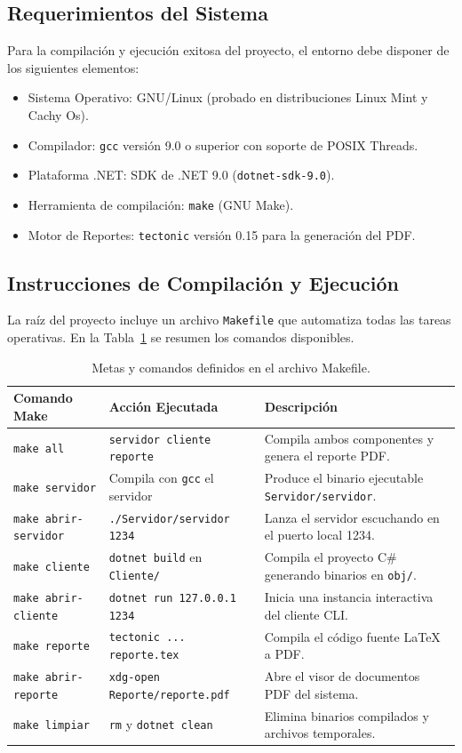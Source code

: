 \documentclass[12pt,a4paper]{article}
\begin{document}
\subsection{Requerimientos del Sistema}
Para la compilación y ejecución exitosa del proyecto, el entorno debe disponer de los siguientes elementos:
\begin{itemize}
    \item Sistema Operativo: GNU/Linux (probado en distribuciones Linux Mint y Cachy Os).
    \item Compilador: \texttt{gcc} versión 9.0 o superior con soporte de POSIX Threads.
    \item Plataforma .NET: SDK de .NET 9.0 (\texttt{dotnet-sdk-9.0}).
    \item Herramienta de compilación: \texttt{make} (GNU Make).
    \item Motor de Reportes: \texttt{tectonic} versión 0.15 para la generación del PDF.
\end{itemize}

\subsection{Instrucciones de Compilación y Ejecución}
La raíz del proyecto incluye un archivo \texttt{Makefile} que automatiza todas las tareas operativas. En la Tabla~\ref{tab:makefile} se resumen los comandos disponibles.

\begin{table}[htbp]
\centering
\footnotesize
\renewcommand{\arraystretch}{0.92}
\begin{tabularx}{\textwidth}{l p{4.2cm} X}
\toprule
\textbf{Comando Make} & \textbf{Acción Ejecutada} & \textbf{Descripción} \\
\midrule
\texttt{make all} & \texttt{servidor cliente reporte} & Compila ambos componentes y genera el reporte PDF. \\
\texttt{make servidor} & Compila con \texttt{gcc} el servidor & Produce el binario ejecutable \texttt{Servidor/servidor}. \\
\texttt{make abrir-servidor} & \texttt{./Servidor/servidor 1234} & Lanza el servidor escuchando en el puerto local 1234. \\
\texttt{make cliente} & \texttt{dotnet build} en \texttt{Cliente/} & Compila el proyecto C\# generando binarios en \texttt{obj/}. \\
\texttt{make abrir-cliente} & \texttt{dotnet run 127.0.0.1 1234} & Inicia una instancia interactiva del cliente CLI. \\
\texttt{make reporte} & \texttt{tectonic ... reporte.tex} & Compila el código fuente LaTeX a PDF. \\
\texttt{make abrir-reporte} & \texttt{xdg-open Reporte/reporte.pdf} & Abre el visor de documentos PDF del sistema. \\
\texttt{make limpiar} & \texttt{rm} y \texttt{dotnet clean} & Elimina binarios compilados y archivos temporales. \\
\bottomrule
\end{tabularx}
\caption{Metas y comandos definidos en el archivo Makefile.}
\label{tab:makefile}
\end{table}
\end{document}
